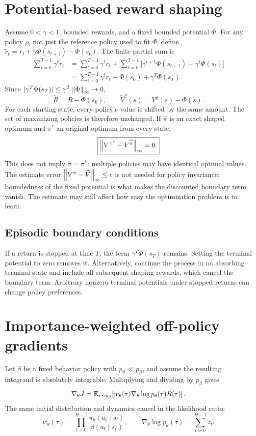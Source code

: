\newpage
\section{Potential-based reward shaping}
Assume $0<\gamma<1$, bounded rewards, and a fixed bounded potential $\Phi$.
For any policy $\rho$, not just the reference policy used to fit $\Phi$, define
$\widetilde r_t=r_t+\gamma\Phi(s_{t+1})-\Phi(s_t)$. The finite partial sum is
\begin{align*}
 \sum_{t=0}^{T-1}\gamma^t\widetilde r_t
 &=\sum_{t=0}^{T-1}\gamma^tr_t
   +\sum_{t=0}^{T-1}\big[\gamma^{t+1}\Phi(s_{t+1})-\gamma^t\Phi(s_t)\big]\\
 &=\sum_{t=0}^{T-1}\gamma^tr_t-\Phi(s_0)+\gamma^T\Phi(s_T).
\end{align*}
Since $|\gamma^T\Phi(s_T)|\leq\gamma^T\left\lVert \Phi\right\rVert_\infty\to0$,
\[
 \boxed{\widetilde R=R-\Phi(s_0),\qquad
        \widetilde V^\rho(s)=V^\rho(s)-\Phi(s).}
\]
For each starting state, every policy's value is shifted by the same amount.
The set of maximizing policies is therefore unchanged. If $\widehat\pi$ is
an exact shaped optimum and $\pi^*$ an original optimum from every state,
\[
 \boxed{\left\lVert V^{\pi^*}-V^{\widehat\pi}\right\rVert_\infty=0.}
\]
This does not imply $\widehat\pi=\pi^*$: multiple policies may have identical
optimal values. The estimate error $\left\lVert V^\pi-\widehat V\right\rVert_\infty\leq\epsilon$
is not needed for policy invariance; boundedness of the fixed potential is
what makes the discounted boundary term vanish. The estimate may still
affect how easy the optimization problem is to learn.

\subsection{Episodic boundary conditions}
If a return is stopped at time $T$, the term $\gamma^T\Phi(s_T)$ remains.
Setting the terminal potential to zero removes it. Alternatively, continue
the process in an absorbing terminal state and include all subsequent
shaping rewards, which cancel the boundary term. Arbitrary nonzero terminal
potentials under stopped returns can change policy preferences.

\section{Importance-weighted off-policy gradients}
Let $\beta$ be a fixed behavior policy with $p_\theta\ll p_\beta$, and assume
the resulting integrand is absolutely integrable. Multiplying and dividing
by $p_\beta$ gives
\[
 \nabla_\theta J
 =\mathbb{E}_{\tau\sim p_\beta}\!\left[
       w_\theta(\tau)\nabla_\theta\log p_\theta(\tau)R(\tau)\right].
\]
The same initial distribution and dynamics cancel in the likelihood ratio:
\[
 \boxed{w_\theta(\tau)=\prod_{t=0}^{H-1}
                 \frac{\pi_\theta(a_t\mid s_t)}{\beta(a_t\mid s_t)},\qquad
 \nabla_\theta\log p_\theta(\tau)=\sum_{t=0}^{H-1}z_t.}
\]

